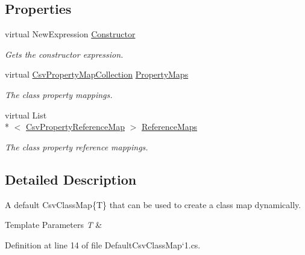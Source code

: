 \subsection*{Properties}
\begin{DoxyCompactItemize}
\item 
virtual New\-Expression \hyperlink{a00059_ae8038b36db7584ef1a73852fcc46404b}{Constructor}
\begin{DoxyCompactList}\small\item\em Gets the constructor expression. \end{DoxyCompactList}\item 
virtual \hyperlink{a00070}{Csv\-Property\-Map\-Collection} \hyperlink{a00059_a9580e897abcba144f3101eb983348e25}{Property\-Maps}
\begin{DoxyCompactList}\small\item\em The class property mappings. \end{DoxyCompactList}\item 
virtual List\\*
$<$ \hyperlink{a00074}{Csv\-Property\-Reference\-Map} $>$ \hyperlink{a00059_a6dfbf8f743b16d2ec83edef865ea2d9e}{Reference\-Maps}
\begin{DoxyCompactList}\small\item\em The class property reference mappings. \end{DoxyCompactList}\end{DoxyCompactItemize}


\subsection{Detailed Description}
A default Csv\-Class\-Map\{\-T\} that can be used to create a class map dynamically. 


\begin{DoxyTemplParams}{Template Parameters}
{\em T} & \\
\hline
\end{DoxyTemplParams}


Definition at line 14 of file Default\-Csv\-Class\-Map`1.\-cs.



